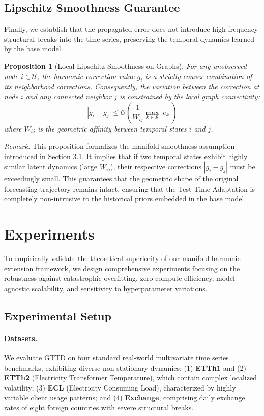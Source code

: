 \documentclass{article}
\newtheorem{proposition}{Proposition}
\begin{document}
\subsection{Lipschitz Smoothness Guarantee}

Finally, we establish that the propagated error does not introduce high-frequency structural breaks into the time series, preserving the temporal dynamics learned by the base model.

\begin{proposition}[Local Lipschitz Smoothness on Graphs]
For any unobserved node $i \in \mathcal{U}$, the harmonic correction value $g_i$ is a strictly convex combination of its neighborhood corrections. Consequently, the variation between the correction at node $i$ and any connected neighbor $j$ is constrained by the local graph connectivity:
\begin{equation}
    |g_i - g_j| \leq \mathcal{O}\left(\frac{1}{W_{ij}} \max_{k \in \mathcal{S}} |e_k|\right)
\end{equation}
where $W_{ij}$ is the geometric affinity between temporal states $i$ and $j$.
\end{proposition}

\textit{Remark:} This proposition formalizes the manifold smoothness assumption introduced in Section 3.1. It implies that if two temporal states exhibit highly similar latent dynamics (large $W_{ij}$), their respective corrections $|g_i - g_j|$ must be exceedingly small. This guarantees that the geometric shape of the original forecasting trajectory remains intact, ensuring that the Test-Time Adaptation is completely non-intrusive to the historical priors embedded in the base model.

	
\section{Experiments}

To empirically validate the theoretical superiority of our manifold harmonic extension framework, we design comprehensive experiments focusing on the robustness against catastrophic overfitting, zero-compute efficiency, model-agnostic scalability, and sensitivity to hyperparameter variations.

\subsection{Experimental Setup}

\paragraph{Datasets.} We evaluate GTTD on four standard real-world multivariate time series benchmarks, exhibiting diverse non-stationary dynamics: (1) \textbf{ETTh1} and (2) \textbf{ETTh2} (Electricity Transformer Temperature), which contain complex localized volatility; (3) \textbf{ECL} (Electricity Consuming Load), characterized by highly variable client usage patterns; and (4) \textbf{Exchange}, comprising daily exchange rates of eight foreign countries with severe structural breaks.
\end{document}
